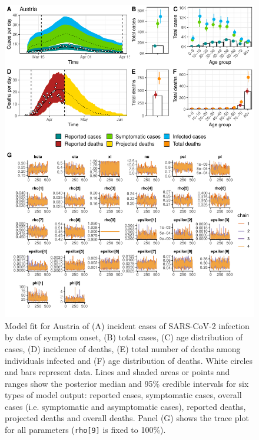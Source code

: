 \documentclass{article}
\begin{document}
\begin{figure}[h]
	\centering
	\includegraphics[width=\linewidth]{../format_output/figures_v3/supp_fit_austria.pdf}
	\caption{Model fit for Austria of (A) incident cases of SARS-CoV-2 infection by date of symptom onset, (B) total cases, (C) age distribution of cases, (D) incidence of deaths, (E) total number of deaths among individuals infected and (F) age distribution of deaths. White circles and bars represent data. Lines and shaded areas or points and ranges show the posterior median and 95\% credible intervals for six types of model output: reported cases, symptomatic cases, overall cases (i.e. symptomatic and asymptomatic cases), reported deaths, projected deaths and overall deaths. Panel (G) shows the trace plot for all parameters (\texttt{rho[9]} is fixed to 100\%).}
	\label{fig:fitaustria}
\end{figure}
\end{document}
